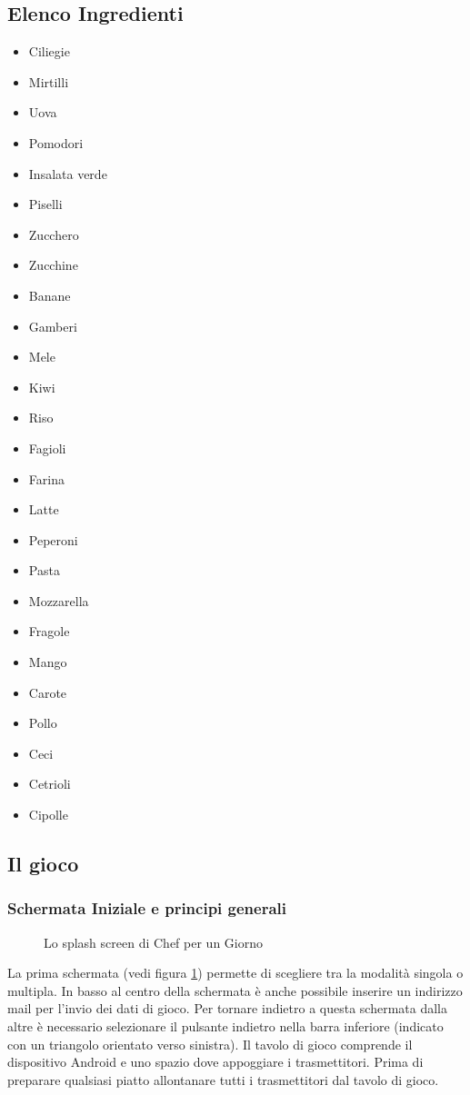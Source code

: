 \subsection{Elenco Ingredienti}
\begin{itemize}
\item Ciliegie
\item Mirtilli
\item Uova
\item Pomodori
\item Insalata verde
\item Piselli
\item Zucchero
\item Zucchine
\item Banane
\item Gamberi
\item Mele
\item Kiwi
\item Riso
\item Fagioli
\item Farina
\item Latte
\item Peperoni
\item Pasta
\item Mozzarella
\item Fragole
\item Mango
\item Carote
\item Pollo
\item Ceci
\item Cetrioli
\item Cipolle
\end{itemize}

\subsection{Il gioco}
\subsubsection{Schermata Iniziale e principi generali}

\begin{figure}[h!]
\label{fig:splash}
\centering
{}
\caption{Lo splash screen di Chef per un Giorno}
\end{figure}

La prima schermata (vedi figura \ref{fig:splash}) permette di scegliere tra la modalità singola o multipla. In basso al centro della schermata è anche possibile inserire un indirizzo mail per l’invio dei dati di gioco. Per tornare indietro a questa schermata dalla altre è necessario selezionare il pulsante indietro nella barra inferiore (indicato con un triangolo orientato verso sinistra). 
Il tavolo di gioco comprende il dispositivo Android e uno spazio dove appoggiare i trasmettitori.
Prima di preparare qualsiasi piatto allontanare tutti i trasmettitori dal tavolo di gioco.


